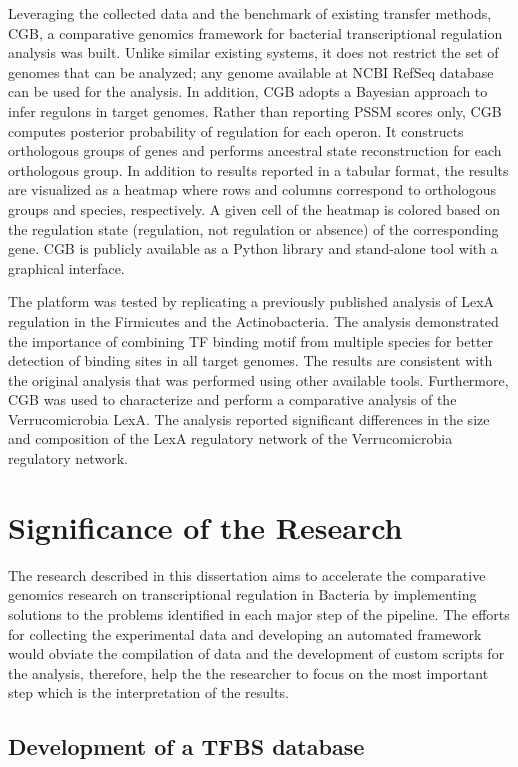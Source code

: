 Leveraging the collected data and the benchmark of existing transfer methods,
CGB, a comparative genomics framework for bacterial transcriptional regulation
analysis was built. Unlike similar existing systems, it does not restrict the
set of genomes that can be analyzed; any genome available at NCBI RefSeq
database can be used for the analysis. In addition, CGB adopts a Bayesian
approach to infer regulons in target genomes. Rather than reporting PSSM scores
only, CGB computes posterior probability of regulation for each operon. It
constructs orthologous groups of genes and performs ancestral state
reconstruction for each orthologous group. In addition to results reported in a
tabular format, the results are visualized as a heatmap where rows and columns
correspond to orthologous groups and species, respectively. A given cell of the
heatmap is colored based on the regulation state (regulation, not regulation or
absence) of the corresponding gene. CGB is publicly available as a Python
library and stand-alone tool with a graphical interface.

The platform was tested by replicating a previously published analysis of LexA
regulation in the Firmicutes and the Actinobacteria. The analysis demonstrated the
importance of combining TF binding motif from multiple species for better
detection of binding sites in all target genomes. The results are consistent
with the original analysis that was performed using other available
tools. Furthermore, CGB was used to characterize and perform a comparative analysis
of the Verrucomicrobia LexA. The analysis reported significant
differences in the size and composition of the LexA regulatory network of the
Verrucomicrobia regulatory network.

\section{Significance of the Research}

The research described in this dissertation aims to accelerate the comparative
genomics research on transcriptional regulation in Bacteria by implementing
solutions to the problems identified in each major step of the pipeline. The
efforts for collecting the experimental data and developing an automated
framework would obviate the compilation of data and the development of custom
scripts for the analysis, therefore, help the the researcher to focus on the
most important step which is the interpretation of the results.

\subsection{Development of a TFBS database}

